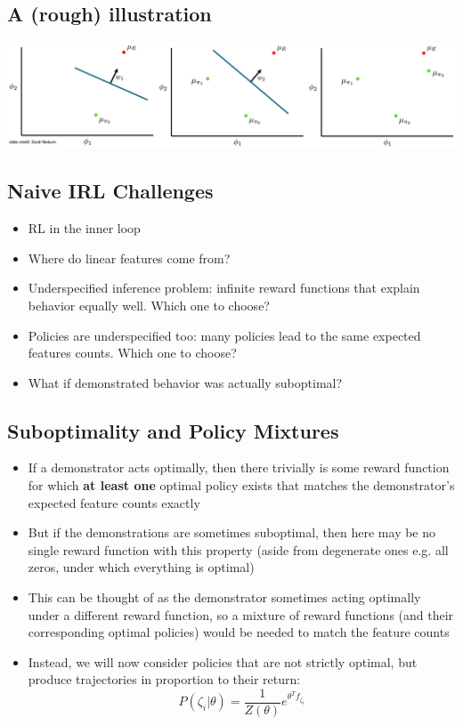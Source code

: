 \documentclass[10pt]{article}
\begin{document}
\subsection*{A (rough) illustration}
\begin{center}
    \includegraphics*[width=\textwidth]{L2_24.png}
\end{center}


\subsection*{Naive IRL Challenges}
\begin{itemize}
	\item RL in the inner loop
	\item Where do linear features come from?
	\item Underspecified inference problem: infinite reward functions that explain behavior equally well.  Which one to choose?
	\item Policies are underspecified too: many policies lead to the same expected features counts.  Which one to choose?
	\item What if demonstrated behavior was actually suboptimal?
\end{itemize}

\subsection*{Suboptimality and Policy Mixtures}
\begin{itemize}
	\item If a demonstrator acts optimally, then there trivially is some reward function for which \textbf{at least one} optimal policy exists that matches the demonstrator's expected feature counts exactly
	\item But if the demonstrations are sometimes suboptimal, then here may be no single reward function with this property (aside from degenerate ones e.g. all zeros, under which everything is optimal)
	\item This can be thought of as the demonstrator sometimes acting optimally under a different reward function, so a mixture of reward functions (and their corresponding optimal policies) would be needed to match the feature counts
	\item Instead, we will now consider policies that are not strictly optimal, but produce trajectories in proportion to their return:
	\[P(\zeta_i | \theta) = \frac{1}{Z(\theta)} e^{\theta^T f_{\zeta_i}}\]
\end{itemize}
\end{document}
